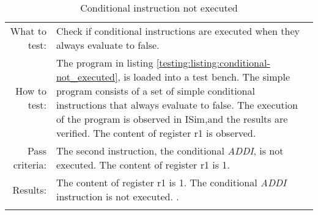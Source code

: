 \begin{table}[H]
  \begin{tabular}{r | p{8cm}}
    \noalign{\smallskip}\hline\noalign{\smallskip}
    
    What to test:  & Check if conditional instructions are executed when they always evaluate to 
                     false. \\

    \noalign{\smallskip}\hline\noalign{\smallskip}

    How to test:   &  The program in listing \ref{testing:listing:conditional-not_executed}, is loaded into a test bench. 
                       The simple program consists of a set of simple conditional instructions that         
                       always evaluate to false. The execution of the program is observed in 
                       ISim,and the results are verified. The content of register r1 is observed.\\

    \noalign{\smallskip}\hline\noalign{\smallskip}

    Pass criteria: & The second instruction, the conditional \emph{ADDI}, is not executed. The content of register r1 is 1.  \\

    \noalign{\smallskip}\hline\noalign{\smallskip}
    
    Results: & The content of register r1 is 1. The conditional \emph{ADDI} instruction is not executed. .  \\
   \noalign{\smallskip}\hline\noalign{\smallskip}
  
  
  
  \end{tabular}
  \caption{Conditional instruction not executed}
  \label{testing:fitness:conditional_not_taken}
\end{table}

